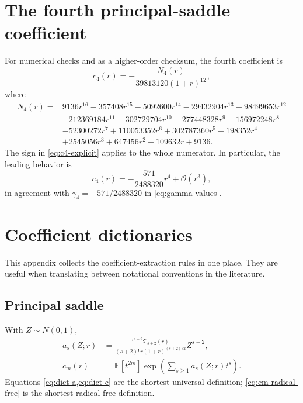 \documentclass[11pt,a4paper]{article}
\theoremstyle{definition}
\theoremstyle{remark}
\newcommand{\Tch}{\mathscr T}
\newcommand{\E}{\mathbb E}
\newcommand{\ii}{\mathrm i}
\newcommand{\BigO}{\mathcal O}
\newcommand{\coef}[2]{[#1^{#2}]}
\begin{document}
\appendix

\section{The fourth principal-saddle coefficient}\label{app:c4}

For numerical checks and as a higher-order checksum, the fourth coefficient is
\begin{equation}\label{eq:c4-explicit}
 c_4(r)=-\frac{N_4(r)}{39813120(1+r)^{12}},
\end{equation}
where
\begin{align*}
 N_4(r)={}&
 9136r^{16}-357408r^{15}-5092600r^{14}-29432904r^{13}
 -98499653r^{12}\\
 &-212369184r^{11}-302729704r^{10}-277448328r^9
 -156972248r^8\\
 &-52300272r^7+110053352r^6+302787360r^5+198352r^4\\
 &+2545056r^3+647456r^2+109632r+9136.
\end{align*}
The sign in \cref{eq:c4-explicit} applies to the whole numerator.  In
particular, the leading behavior is
\begin{equation}\label{eq:c4-leading}
 c_4(r)=-\frac{571}{2488320}r^4+\BigO(r^3),
\end{equation}
in agreement with \(\gamma_4=-571/2488320\) in
\cref{eq:gamma-values}.

\section{Coefficient dictionaries}\label{app:dictionaries}

This appendix collects the coefficient-extraction rules in one place.  They
are useful when translating between notational conventions in the literature.

\subsection{Principal saddle}

With \(Z\sim N(0,1)\),
\begin{align}
 a_s(Z;r)
 &=\frac{\ii^{s+2}\Tch_{s+2}(r)}
         {(s+2)!\,r(1+r)^{(s+2)/2}}Z^{s+2},
 \label{eq:dict-a}\\
 c_m(r)
 &=\E\coef{t}{2m}
   \exp\!\left(\sum_{s\ge1}a_s(Z;r)t^s\right).
 \label{eq:dict-c}
\end{align}
Equations \cref{eq:dict-a,eq:dict-c} are the shortest universal definition;
\cref{eq:cm-radical-free} is the shortest radical-free definition.
\end{document}
